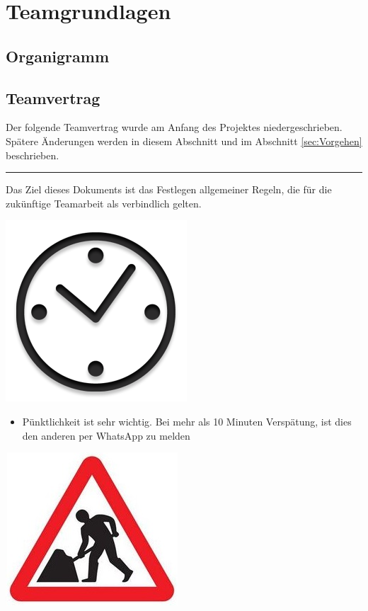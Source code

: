 \chapter{Teamgrundlagen}
\label{sec:Teamgrundlagen}

\section{Organigramm}

\section{Teamvertrag}

Der folgende Teamvertrag wurde am Anfang des Projektes niedergeschrieben. Spätere Änderungen werden in diesem Abschnitt und im Abschnitt \ref{sec:Vorgehen} beschrieben.

\vspace{20mm}
\rule{\textwidth}{1pt}

Das Ziel dieses Dokuments ist das Festlegen allgemeiner Regeln, die für die zukünftige Teamarbeit als verbindlich gelten.\\

\begin{center}
\includegraphics[scale=0.25]{img/clock}\\
\end{center}


\begin{itemize}
\item Pünktlichkeit ist sehr wichtig. Bei mehr als 10 Minuten Verspätung, ist dies den anderen per WhatsApp zu melden
\end{itemize}

\begin{center}
\includegraphics[scale=1.1]{img/work}\\
\end{center}

